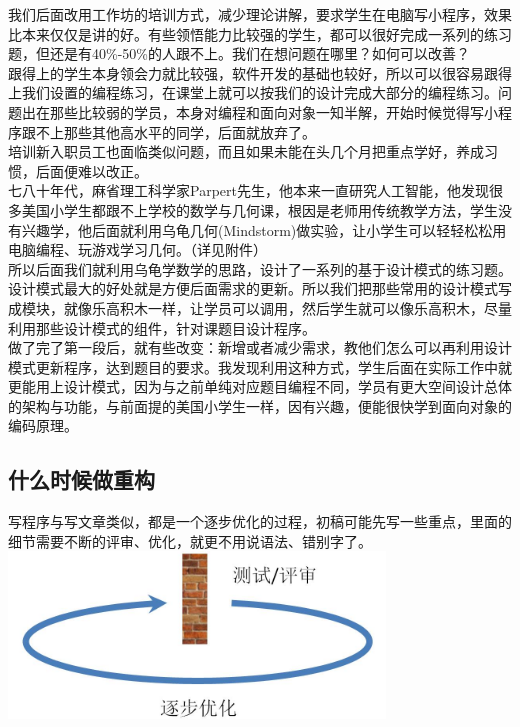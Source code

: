 我们后面改用工作坊的培训方式，减少理论讲解，要求学生在电脑写小程序，效果比本来仅仅是讲的好。有些领悟能力比较强的学生，都可以很好完成一系列的练习题，但还是有40\%-50\%的人跟不上。我们在想问题在哪里？如何可以改善？\\
跟得上的学生本身领会力就比较强，软件开发的基础也较好，所以可以很容易跟得上我们设置的编程练习，在课堂上就可以按我们的设计完成大部分的编程练习。问题出在那些比较弱的学员，本身对编程和面向对象一知半解，开始时候觉得写小程序跟不上那些其他高水平的同学，后面就放弃了。\\
培训新入职员工也面临类似问题，而且如果未能在头几个月把重点学好，养成习惯，后面便难以改正。\\
七八十年代，麻省理工科学家Parpert先生，他本来一直研究人工智能，他发现很多美国小学生都跟不上学校的数学与几何课，根因是老师用传统教学方法，学生没有兴趣学，他后面就利用乌龟几何(Mindstorm)做实验，让小学生可以轻轻松松用电脑编程、玩游戏学习几何。（详见附件）\\
所以后面我们就利用乌龟学数学的思路，设计了一系列的基于设计模式的练习题。设计模式最大的好处就是方便后面需求的更新。所以我们把那些常用的设计模式写成模块，就像乐高积木一样，让学员可以调用，然后学生就可以像乐高积木，尽量利用那些设计模式的组件，针对课题目设计程序。\\
做了完了第一段后，就有些改变：新增或者减少需求，教他们怎么可以再利用设计模式更新程序，达到题目的要求。我发现利用这种方式，学生后面在实际工作中就更能用上设计模式，因为与之前单纯对应题目编程不同，学员有更大空间设计总体的架构与功能，与前面提的美国小学生一样，因有兴趣，便能很快学到面向对象的编码原理。\\

\hypertarget{ux4ec0ux4e48ux65f6ux5019ux505aux91cdux6784}{%
\subsection{什么时候做重构}\label{ux4ec0ux4e48ux65f6ux5019ux505aux91cdux6784}}

写程序与写文章类似，都是一个逐步优化的过程，初稿可能先写一些重点，里面的细节需要不断的评审、优化，就更不用说语法、错别字了。\\

\includegraphics[width=10cm]{环形图1.jpg}


